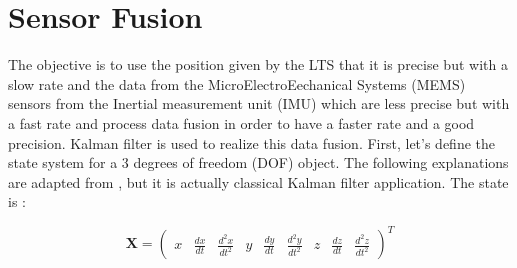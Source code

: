 \documentclass{vldb}
\begin{document}
\section{Sensor Fusion} \label{SF}


The objective is to use the position given by the LTS that it is precise but with a slow rate and the data from the MicroElectroEechanical Systems (MEMS) sensors from the Inertial measurement unit (IMU) which are less precise but with a fast rate and process data fusion in order to have a faster rate and a good precision. Kalman filter is used to realize this data fusion. First, let's define the state system for a 3 degrees of freedom (DOF) object. The following explanations are adapted from \cite{caron2006gps}, but it is actually classical Kalman filter application. The state is :


\begin{equation}
\mathbf{X} = 
\begin{pmatrix}

x & \frac{dx}{dt} & \frac{d^2x}{dt^2} &
y & \frac{dy}{dt} & \frac{d^2y}{dt^2} &
z & \frac{dz}{dt} &  \frac{d^2z}{dt^2} 
\end{pmatrix} ^T
\end{equation}
\end{document}

